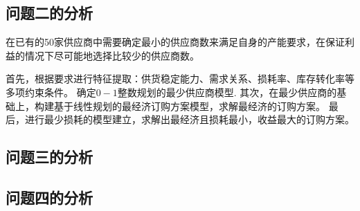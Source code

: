 \documentclass[UTF8]{ctexart}
\begin{document}
\subsection{问题二的分析}

在已有的50家供应商中需要确定最小的供应商数来满足自身的产能要求，在保证利益的情况下尽可能地选择比较少的供应商数。

首先，根据要求进行特征提取：供货稳定能力、需求关系、损耗率、库存转化率等多项约束条件。
确定$0-1$整数规划的最少供应商模型.
其次，在最少供应商的基础上，构建基于线性规划的最经济订购方案模型，求解最经济的订购方案。
最后，进行最少损耗的模型建立，求解出最经济且损耗最小，收益最大的订购方案。
\subsection{问题三的分析}
\subsection{问题四的分析}
\end{document}
